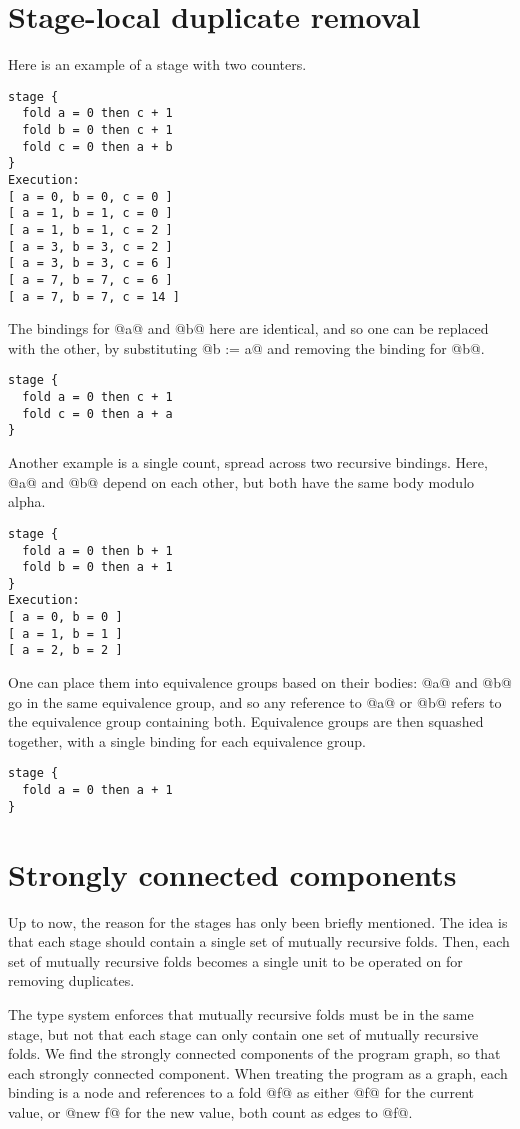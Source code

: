 \section{Stage-local duplicate removal}
Here is an example of a stage with two counters.
\begin{lstlisting}
stage {
  fold a = 0 then c + 1
  fold b = 0 then c + 1
  fold c = 0 then a + b
}
Execution:
[ a = 0, b = 0, c = 0 ]
[ a = 1, b = 1, c = 0 ]
[ a = 1, b = 1, c = 2 ]
[ a = 3, b = 3, c = 2 ]
[ a = 3, b = 3, c = 6 ]
[ a = 7, b = 7, c = 6 ]
[ a = 7, b = 7, c = 14 ]
\end{lstlisting}

The bindings for @a@ and @b@ here are identical, and so one can be replaced with the other, by substituting @b := a@ and removing the binding for @b@.
\begin{lstlisting}
stage {
  fold a = 0 then c + 1
  fold c = 0 then a + a
}
\end{lstlisting}

Another example is a single count, spread across two recursive bindings.
Here, @a@ and @b@ depend on each other, but both have the same body modulo alpha.
\begin{lstlisting}
stage {
  fold a = 0 then b + 1
  fold b = 0 then a + 1
}
Execution:
[ a = 0, b = 0 ]
[ a = 1, b = 1 ]
[ a = 2, b = 2 ]
\end{lstlisting}

One can place them into equivalence groups based on their bodies: @a@ and @b@ go in the same equivalence group, and so any reference to @a@ or @b@ refers to the equivalence group containing both.
Equivalence groups are then squashed together, with a single binding for each equivalence group.
\begin{lstlisting}
stage {
  fold a = 0 then a + 1
}
\end{lstlisting}




\section{Strongly connected components}
Up to now, the reason for the stages has only been briefly mentioned.
The idea is that each stage should contain a single set of mutually recursive folds.
Then, each set of mutually recursive folds becomes a single unit to be operated on for removing duplicates.

The type system enforces that mutually recursive folds must be in the same stage, but not that each stage can only contain one set of mutually recursive folds.
We find the strongly connected components of the program graph, so that each strongly connected component.
When treating the program as a graph, each binding is a node and references to a fold @f@ as either @f@ for the current value, or @new f@ for the new value, both count as edges to @f@.

